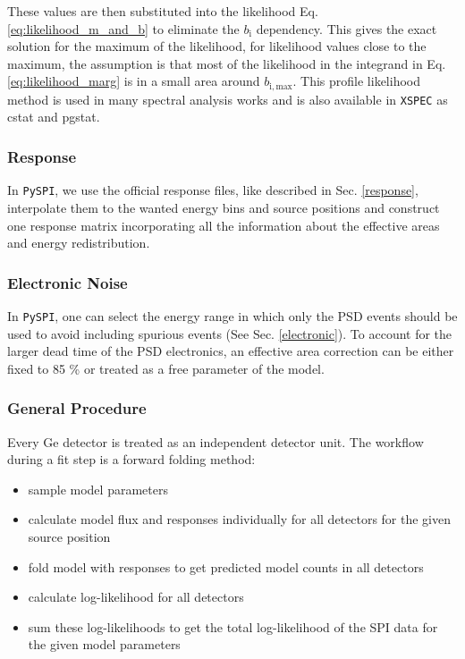 \documentclass[twocolumn,traditabstract]{aa}
\begin{document}
These values are then substituted into the likelihood Eq. \ref{eq:likelihood_m_and_b} to eliminate the $b_{\mathrm{i}}$ dependency. This gives the exact solution for the maximum of the likelihood, for likelihood values close to the maximum, the assumption is that most of the likelihood in the integrand in Eq. \ref{eq:likelihood_marg} is in a small area around $b_{\mathrm{i,max}}$.
This profile likelihood method is used in many spectral analysis works \citep[e.g.][]{profile2, profile1} and is also available in {\tt XSPEC} \citep{xspec} as cstat and pgstat.

\subsubsection{Response}

In {\tt PySPI}, we use the official response files, like described in Sec. \ref{response}, interpolate them to the wanted energy bins and source positions and construct one response matrix incorporating all the information about the effective areas and energy redistribution.

\subsubsection{Electronic Noise}

In {\tt PySPI}, one can select the energy range in which only the PSD events should be used to avoid including spurious events (See Sec. \ref{electronic}). To account for the larger dead time of the PSD electronics, an effective area correction can be either fixed to 85 \% \citep{spi_electronic_noise} or treated as a free parameter of the model.

\subsubsection{General Procedure}

Every Ge detector is treated as an independent detector unit. The workflow during a fit step is a forward folding method:
\begin{itemize}
  \item sample model parameters
  \item calculate model flux and responses individually for all detectors for the given source position
  \item fold model with responses to get predicted model counts in all detectors
  \item calculate log-likelihood for all detectors
  \item sum these log-likelihoods to get the total log-likelihood of the SPI data for the given model parameters
\end{itemize}
\end{document}
